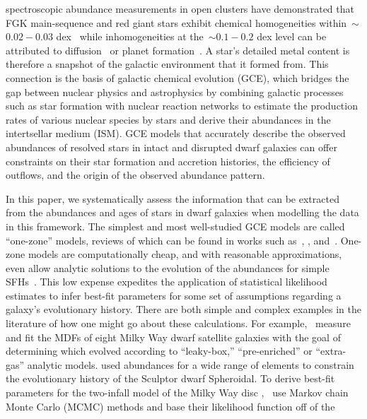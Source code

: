 spectroscopic abundance measurements in open clusters have demonstrated that
FGK main-sequence and red giant stars exhibit chemical homogeneities
within~$\sim$$0.02 - 0.03$ dex~\citep{DeSilva2006, Bovy2016a, Liu2016b,
Casamiquela2020} while inhomogeneities at the~$\sim$$0.1 - 0.2$ dex level can
be attributed to diffusion~\citep{BertelliMotta2018, Liu2019, Souto2019} or
planet formation~\citep{Melendez2009, Liu2016a, Spina2018}.
A star's detailed metal content is therefore a snapshot of the galactic
environment that it formed from.
This connection is the basis of galactic chemical evolution (GCE), which
bridges the gap between nuclear physics and astrophysics by combining galactic
processes such as star formation with nuclear reaction networks to estimate the
production rates of various nuclear species by stars and derive their
abundances in the intertsellar medium (ISM).
GCE models that accurately describe the observed abundances of resolved stars
in intact and disrupted dwarf galaxies can offer constraints on their star
formation and accretion histories, the efficiency of outflows, and the origin
of the observed abundance pattern.
\par
In this paper, we systematically assess the information that can be extracted
from the abundances and ages of stars in dwarf galaxies when modelling the
data in this framework.
The simplest and most well-studied GCE models are called ``one-zone'' models,
reviews of which can be found in works such as~\citet{Tinsley1980},
\citet{Pagel2009}, and~\citet{Matteucci2012, Matteucci2021}.
One-zone models are computationally cheap, and with reasonable approximations,
even allow analytic solutions to the evolution of the abundances for simple
SFHs~\citep*[e.g.,][]{Weinberg2017b}.
This low expense expedites the application of statistical likelihood estimates
to infer best-fit parameters for some set of assumptions regarding a galaxy's
evolutionary history.
There are both simple and complex examples in the literature of how one might
go about these calculations.
For example,~\citet{Kirby2011} measure and fit the MDFs of eight Milky Way
dwarf satellite galaxies with the goal of determining which evolved according
to ``leaky-box,'' ``pre-enriched'' or ``extra-gas'' analytic models.
\citet{delosReyes2022} used abundances for a wide range of elements to
constrain the evolutionary history of the Sculptor dwarf Spheroidal.
To derive best-fit parameters for the two-infall model of the Milky Way disc
\citep[e.g.,][]{Chiappini1997},~\citet{Spitoni2020, Spitoni2021} use Markov
chain Monte Carlo (MCMC) methods and base their likelihood function off of the
